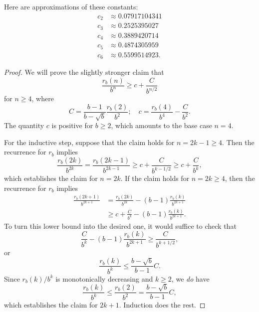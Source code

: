 \documentclass[12pt]{article}
\theoremstyle{definition}
\begin{document}
Here are approximations of these constants:
\begin{align*}
    c_2 &\approx 0.07917104341 \\
    c_3 &\approx 0.2525395027 \\
    c_4 &\approx 0.3889420714 \\
    c_5 &\approx 0.4874305959 \\
    c_6 &\approx 0.5599514923.
\end{align*}

\begin{proof}
    We will prove the slightly stronger claim that
    \begin{equation*}
        \frac{r_b(n)}{b^n} \geq c + \frac{C}{b^{n / 2}}
    \end{equation*}
    for $n \geq 4$, where
    \begin{equation*}
        C = \frac{b - 1}{b - \sqrt{b}} \frac{r_b(2)}{b^2}
        ; \quad
        c = \frac{r_b(4)}{b^4} - \frac{C}{b^2}.
    \end{equation*}
    The quantity $c$ is positive for $b \geq 2$, which amounts to the base case
    $n = 4$.

    For the inductive step, suppose that the claim holds for $n = 2k - 1 \geq
    4$. Then the recurrence for $r_b$ implies
    \begin{equation*}
        \frac{r_b(2k)}{b^{2k}} = \frac{r_b(2k - 1)}{b^{2k - 1}}
                               \geq c + \frac{C}{b^{k - 1 / 2}}
                               \geq c + \frac{C}{b^k},
    \end{equation*}
    which establishes the claim for $n = 2k$. If the claim holds for $n = 2k
    \geq 4$, then the recurrence for $r_b$ implies
    \begin{align*}
        \frac{r_b(2k + 1)}{b^{2k + 1}} &= \frac{r_b(2k)}{b^{2k}} - (b - 1) \frac{r_b(k)}{b^{2k + 1}} \\
                                       &\geq c + \frac{C}{b^k} - (b - 1)\frac{r_b(k)}{b^{2k + 1}}.
    \end{align*}
    To turn this lower bound into the desired one, it would suffice to check
    that
    \begin{equation*}
        \frac{C}{b^k} - (b - 1)\frac{r_b(k)}{b^{2k + 1}} \geq \frac{C}{b^{k + 1/2}},
    \end{equation*}
    or
    \begin{equation*}
        \frac{r_b(k)}{b^k} \leq \frac{b - \sqrt{b}}{b - 1} C.
    \end{equation*}
    Since $r_b(k) / b^k$ is monotonically decreasing and $k \geq 2$, we
    \emph{do} have
    \begin{equation*}
        \frac{r_b(k)}{b^k} \leq \frac{r_b(2)}{b^2} = \frac{b - \sqrt{b}}{b - 1} C,
    \end{equation*}
    which establishes the claim for $2k + 1$. Induction does the rest.


\end{proof}
\end{document}
